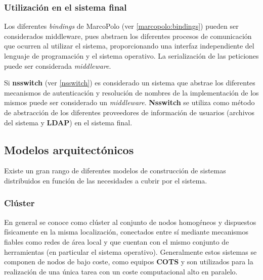 \subsubsection{Utilización en el sistema final}

Los diferentes \textit{bindings} de MarcoPolo (ver \ref{marcopolo:bindings}) pueden ser considerados middleware, pues abstraen los diferentes procesos de comunicación que ocurren al utilizar el sistema, proporcionando una interfaz independiente del lenguaje de programación y el sistema operativo. La serialización de las peticiones puede ser considerada \textit{middleware}.

Si \textbf{nsswitch} (ver \ref{nsswitch}) es considerado un sistema que abstrae los diferentes mecanismos de autenticación y resolución de nombres de la implementación de los mismos puede ser considerado un \textit{middleware}. \textbf{Nsswitch} se utiliza como método de abstracción de los diferentes proveedores de información de usuarios (archivos del sistema y \textbf{LDAP}) en el sistema final.

\subsection{Modelos arquitectónicos}

Existe un gran rango de diferentes modelos de construcción de sistemas distribuidos en función de las necesidades a cubrir por el sistema.


\subsubsection{Clúster}

En general se conoce como clúster al conjunto de nodos homogéneos y dispuestos físicamente en la misma localización, conectados entre sí mediante mecanismos fiables como redes de área local y que cuentan con el mismo conjunto de herramientas (en particular el sistema operativo). Generalmente estos sistemas se componen de nodos de bajo coste, como equipos \textbf{COTS} y son utilizados para la realización de una única tarea con un coste computacional alto en paralelo.


